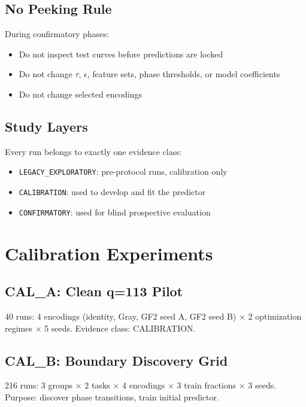 \documentclass[11pt]{article}
\begin{document}
\subsection{No Peeking Rule}

During confirmatory phases:
\begin{itemize}[leftmargin=*]
    \item Do not inspect test curves before predictions are locked
    \item Do not change $\tau$, $\epsilon$, feature sets, phase thresholds, or model coefficients
    \item Do not change selected encodings
\end{itemize}

\subsection{Study Layers}

Every run belongs to exactly one evidence class:
\begin{itemize}[leftmargin=*]
    \item \texttt{LEGACY\_EXPLORATORY}: pre-protocol runs, calibration only
    \item \texttt{CALIBRATION}: used to develop and fit the predictor
    \item \texttt{CONFIRMATORY}: used for blind prospective evaluation
\end{itemize}

\section{Calibration Experiments}\label{sec:calibration}

\subsection{CAL\_A: Clean q=113 Pilot}

40 runs: 4 encodings (identity, Gray, GF2 seed A, GF2 seed B) $\times$ 2 optimization regimes $\times$ 5 seeds. Evidence class: CALIBRATION.

\subsection{CAL\_B: Boundary Discovery Grid}

216 runs: 3 groups $\times$ 2 tasks $\times$ 4 encodings $\times$ 3 train fractions $\times$ 3 seeds. Purpose: discover phase transitions, train initial predictor.
\end{document}
